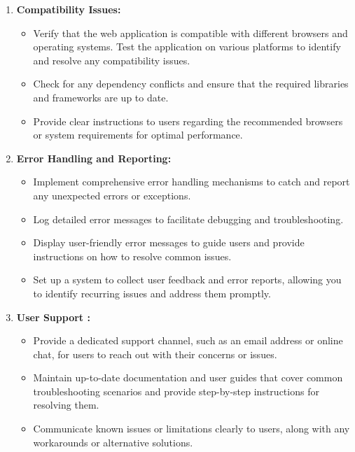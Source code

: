 \begin{enumerate}
	\item \textbf{Compatibility Issues:}
	
\begin{itemize}
	\item 	Verify that the web application is compatible with different browsers and operating systems. Test the application on various platforms to identify and resolve any compatibility issues.
\item 	Check for any dependency conflicts and ensure that the required libraries and frameworks are up to date.
\item 	Provide clear instructions to users regarding the recommended browsers or system requirements for optimal performance.
\end{itemize}
	
	\item \textbf{Error Handling and Reporting:}
	
 \begin{itemize}
 	\item 	Implement comprehensive error handling mechanisms to catch and report any unexpected errors or exceptions.
 	\item 	Log detailed error messages to facilitate debugging and troubleshooting.
 	\item 	Display user-friendly error messages to guide users and provide instructions on how to resolve common issues.
 	\item 	Set up a system to collect user feedback and error reports, allowing you to identify recurring issues and address them promptly.
 \end{itemize}
	
	\item \textbf{User Support :}
	\begin{itemize}
		\item 	Provide a dedicated support channel, such as an email address or online chat, for users to reach out with their concerns or issues.
		\item 	Maintain up-to-date documentation and user guides that cover common troubleshooting scenarios and provide step-by-step instructions for resolving them.
		\item 	Communicate known issues or limitations clearly to users, along with any workarounds or alternative solutions.
		
	\end{itemize}
\end{enumerate}











